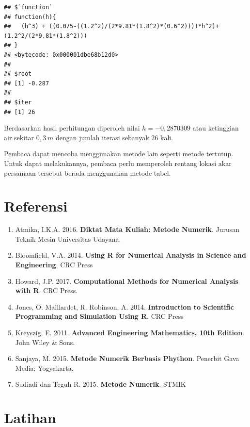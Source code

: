 \documentclass[
]{book}
\providecommand{\tightlist}{%
  \setlength{\itemsep}{0pt}\setlength{\parskip}{0pt}}
\theoremstyle{definition}
\theoremstyle{definition}
\theoremstyle{definition}
\theoremstyle{definition}
\theoremstyle{remark}
\begin{document}
\begin{verbatim}
## $`function`
## function(h){
##   (h^3) + ((0.075-((1.2^2)/(2*9.81*(1.8^2)*(0.6^2))))*h^2)+ (1.2^2/(2*9.81*(1.8^2)))
## }
## <bytecode: 0x000001dbe68b12d0>
## 
## $root
## [1] -0.287
## 
## $iter
## [1] 26
\end{verbatim}

Berdasarkan hasil perhitungan diperoleh nilai \(h=-0,2870309\) atau ketinggian air sekitar \(0,3\ m\) dengan jumlah iterasi sebanyak \(26\) kali.

Pembaca dapat mencoba menggunakan metode lain seperti metode tertutup. Untuk dapat melakukannya, pembaca perlu memperoleh rentang lokasi akar persamaan tersebut berada menggunakan metode tabel.

\hypertarget{referensi-6}{%
\section{Referensi}\label{referensi-6}}

\begin{enumerate}
\def\labelenumi{\arabic{enumi}.}
\tightlist
\item
  Atmika, I.K.A. 2016. \textbf{Diktat Mata Kuliah: Metode Numerik}. Jurusan Teknik Mesin Universitas Udayana.
\item
  Bloomfield, V.A. 2014. \textbf{Using R for Numerical Analysis in Science and Engineering}. CRC Press
\item
  Howard, J.P. 2017. \textbf{Computational Methods for Numerical Analysis with R}. CRC Press.
\item
  Jones, O. Maillardet, R. Robinson, A. 2014. \textbf{Introduction to Scientific Programming and Simulation Using R}. CRC Press
\item
  Kreyszig, E. 2011. \textbf{Advanced Engineering Mathematics, 10th Edition}. John Wiley \& Sons.
\item
  Sanjaya, M. 2015. \textbf{Metode Numerik Berbasis Phython}. Penerbit Gava Media: Yogyakarta.
\item
  Sudiadi dan Teguh R. 2015. \textbf{Metode Numerik}. STMIK
\end{enumerate}

\hypertarget{latihan-1}{%
\section{Latihan}\label{latihan-1}}
\end{document}
